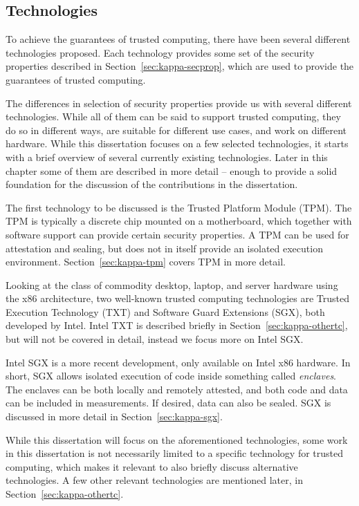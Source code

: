 \subsection{Technologies}

To achieve the guarantees of trusted computing, there have been several different technologies proposed.
Each technology provides some set of the security properties described in Section~\ref{sec:kappa-secprop}, which are used to provide the guarantees of trusted computing.

The differences in selection of security properties provide us with several different technologies.
While all of them can be said to support trusted computing, they do so in different ways, are suitable for different use cases, and work on different hardware.
While this dissertation focuses on a few selected technologies, it starts with a brief overview of several currently existing technologies.
Later in this chapter some of them are described in more detail -- enough to provide a solid foundation for the discussion of the contributions in the dissertation.

The first technology to be discussed is the Trusted Platform Module (TPM).
The TPM is typically a discrete chip mounted on a motherboard, which together with software support can provide certain security properties.
A TPM can be used for attestation and sealing, but does not in itself provide an isolated execution environment.
Section~\ref{sec:kappa-tpm} covers TPM in more detail.

Looking at the class of commodity desktop, laptop, and server hardware using the x86 architecture, two well-known trusted computing technologies are Trusted Execution Technology (TXT) and Software Guard Extensions (SGX), both developed by Intel.
Intel TXT is described briefly in Section~\ref{sec:kappa-othertc}, but will not be covered in detail, instead we focus more on Intel SGX.

Intel SGX is a more recent development, only available on Intel x86 hardware.
In short, SGX allows isolated execution of code inside something called \emph{enclaves}.
The enclaves can be both locally and remotely attested, and both code and data can be included in measurements.
If desired, data can also be sealed.
SGX is discussed in more detail in Section~\ref{sec:kappa-sgx}.

While this dissertation will focus on the aforementioned technologies, some work in this dissertation is not necessarily limited to a specific technology for trusted computing, which makes it relevant to also briefly discuss alternative technologies.
A few other relevant technologies are mentioned later, in Section~\ref{sec:kappa-othertc}.

